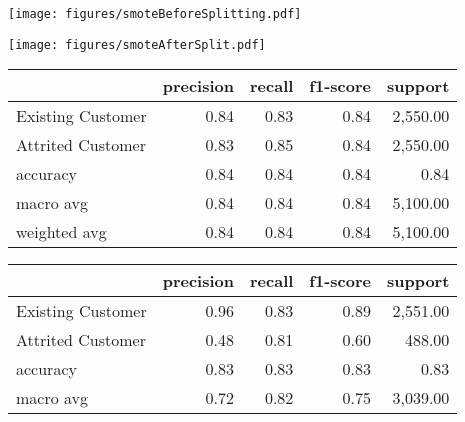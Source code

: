 \iffalse %
\begin{figure*}[!ht]
    \begin{minipage}{0.45\textwidth}
        \centering
        \texttt{[image: figures/smoteBeforeSplitting.pdf]}
        \label{fig:sampling_leakage1}
        \vspace{1cm}
    \end{minipage}
    \hfill
    \begin{minipage}{0.45\textwidth}
        \centering
        \texttt{[image: figures/smoteAfterSplit.pdf]}
        \label{fig:sampling_leakage2}
    \end{minipage}
    \vfill
    \begin{minipage}{0.45\textwidth}
        \centering
        \begin{tabular}{lrrrr}
            \toprule
            {} &  precision &  recall &  f1-score &   support \\
            \midrule
            Existing Customer &      0.84 &   0.83 &     0.84 & 2,550.00 \\
            Attrited Customer &      0.83 &   0.85 &     0.84 & 2,550.00 \\
            accuracy          &      0.84 &   0.84 &     0.84 &    0.84 \\
            macro avg         &      0.84 &   0.84 &     0.84 & 5,100.00 \\
            weighted avg      &      0.84 &   0.84 &     0.84 & 5,100.00 \\
        \bottomrule
        \end{tabular}
        \label{tab:samp_leak}
    \end{minipage}
    \hfill
    \begin{minipage}{0.45\textwidth}
        \centering
        \begin{tabular}{lrrrr}
            \toprule
            {} &  precision &  recall &  f1-score &   support \\
            \midrule
            Existing Customer &      0.96 &   0.83 &     0.89 & 2,551.00 \\
            Attrited Customer &      0.48 &   0.81 &     0.60 &   488.00 \\
            accuracy          &      0.83 &   0.83 &     0.83 &   0.83 \\
            macro avg         &      0.72 &   0.82 &     0.75 & 3,039.00 \\

\end{tabular}
\end{minipage}
\end{figure*}

